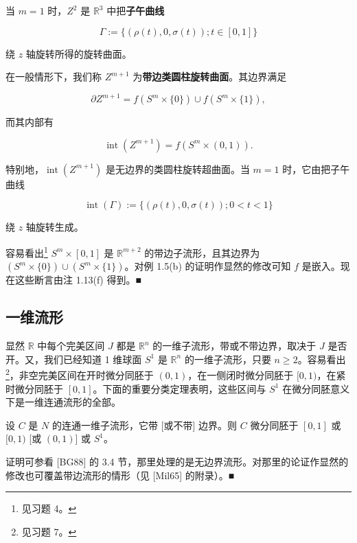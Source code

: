 \begin{example}

当 $ m = 1 $ 时，$ Z^{2} $ 是 $ \mathbb{R}^{3} $ 中把\textbf{子午曲线}

\[
\Gamma := \{(\rho(t), 0, \sigma(t)) ; t \in [0, 1]\}
\]

绕 $ z $ 轴旋转所得的旋转曲面。

在一般情形下，我们称 $ Z^{m+1} $ 为\textbf{带边类圆柱旋转曲面}。其边界满足

\[
\partial Z^{m+1} = f(S^{m} \times \{0\}) \cup f(S^{m} \times \{1\}),
\]

而其内部有

\[
\operatorname{int}(Z^{m+1}) = f(S^{m} \times (0, 1)).
\]

特别地，$ \operatorname{int}(Z^{m+1}) $ 是无边界的类圆柱旋转超曲面。当 $ m = 1 $ 时，它由把子午曲线

\[
\operatorname{int}(\Gamma) := \{(\rho(t), 0, \sigma(t)) ; 0 < t < 1\}
\]

绕 $ z $ 轴旋转生成。

\proofhead
容易看出\footnote{见习题 4。} $ S^{m} \times [0, 1] $ 是 $ \mathbb{R}^{m+2} $ 的带边子流形，且其边界为 $ (S^{m} \times \{0\}) \cup (S^{m} \times \{1\}) $。对例 1.5(b) 的证明作显然的修改可知 $ f $ 是嵌入。现在这些断言由注 1.13(f) 得到。\nobreak\hspace{0.35em}■
\end{example}

\subsection*{一维流形}

显然 $ \mathbb{R} $ 中每个完美区间 $ J $ 都是 $ \mathbb{R}^{n} $ 的一维子流形，带或不带边界，取决于 $ J $ 是否开。又，我们已经知道 1 维球面 $ S^{1} $ 是 $ \mathbb{R}^{n} $ 的一维子流形，只要 $ n \ge 2 $。容易看出\footnote{见习题 7。}，非空完美区间在开时微分同胚于 $ (0, 1) $，在一侧闭时微分同胚于 $ [0, 1) $，在紧时微分同胚于 $ [0, 1] $。下面的重要分类定理表明，这些区间与 $ S^{1} $ 在微分同胚意义下是一维连通流形的全部。

\begin{theorem}

设 $ C $ 是 $ N $ 的连通一维子流形，它带 [或不带] 边界。则 $ C $ 微分同胚于 $ [0, 1] $ 或 $ [0, 1) $ [或 $ (0, 1) $] 或 $ S^{1} $。

\proofhead
证明可参看 [BG88] 的 3.4 节，那里处理的是无边界流形。对那里的论证作显然的修改也可覆盖带边流形的情形（见 [Mil65] 的附录）。\nobreak\hspace{0.35em}■
\end{theorem}

